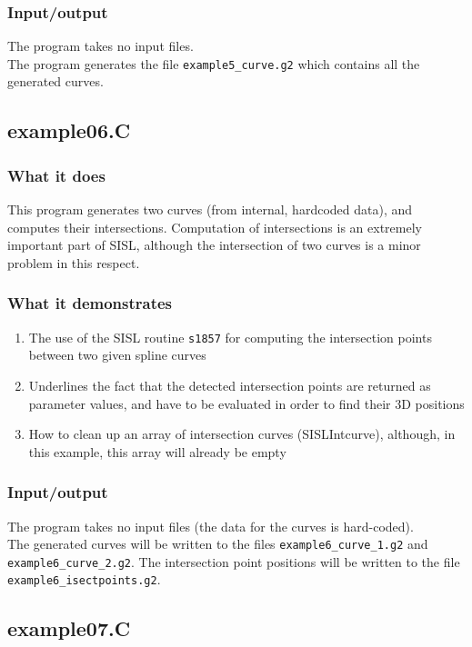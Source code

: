 \subsubsection{Input/output}
The program takes no input files.\\
The program generates the file \verb/example5_curve.g2/ which contains all the generated curves.

\subsection{example06.C}

\subsubsection{What it does}
This program generates two curves (from internal, hardcoded data), and computes their 
intersections.  Computation of intersections is an extremely important part of SISL, although 
the intersection of two curves is a minor problem in this respect.
\subsubsection{What it demonstrates}
\begin{enumerate}
\item The use of the SISL routine \verb/s1857/ for computing the intersection points between
two given spline curves
\item Underlines the fact that the detected intersection points are returned as parameter values,
and have to be evaluated in order to find their 3D positions
\item How to clean up an array of intersection curves (SISLIntcurve), although, in 
this example, this array will already be empty
\end{enumerate}
\subsubsection{Input/output}
The program takes no input files (the data for the curves is hard-coded).  \\
The generated curves will be written to the files \verb/example6_curve_1.g2/ and \\
\verb/example6_curve_2.g2/.  The intersection point positions will be written to the file
\verb/example6_isectpoints.g2/.

\subsection{example07.C}

